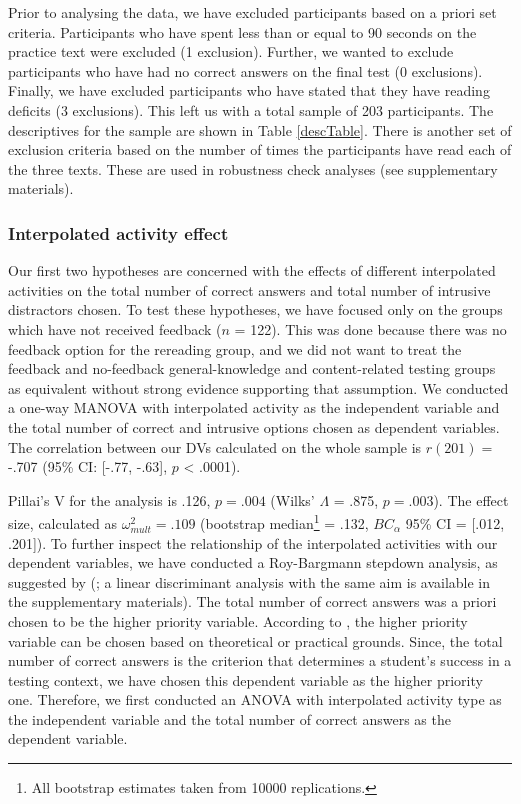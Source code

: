 \documentclass[../main.tex]{subfiles}
\begin{document}
Prior to analysing the data, we have excluded participants based on a
priori set criteria. Participants who have spent less than or equal to
90 seconds on the practice text were excluded (1 exclusion). Further, we
wanted to exclude participants who have had no correct answers on the
final test (0 exclusions). Finally, we have excluded participants who
have stated that they have reading deficits (3 exclusions). This left us
with a total sample of 203 participants. The descriptives for the sample
are shown in Table \ref{descTable}. There is another set of exclusion
criteria based on the number of times the participants have read each of
the three texts. These are used in robustness check analyses (see
supplementary materials).

\hypertarget{interpolated-activity-effect}{%
\subsubsection{Interpolated activity
effect}\label{interpolated-activity-effect}}

Our first two hypotheses are concerned with the effects of different
interpolated activities on the total number of correct answers and total
number of intrusive distractors chosen. To test these hypotheses, we
have focused only on the groups which have not received feedback (\(n\)
= 122). This was done because there was no feedback option for the
rereading group, and we did not want to treat the feedback and
no-feedback general-knowledge and content-related testing groups as
equivalent without strong evidence supporting that assumption. We
conducted a one-way MANOVA with interpolated activity as the independent
variable and the total number of correct and intrusive options chosen as
dependent variables. The correlation between our DVs calculated on the
whole sample is \(r(201) =\) -.707 (95\% CI: {[}-.77, -.63{]}, \(p\)
\textless{} .0001).

Pillai's V for the analysis is .126, \(p = .004\) (Wilks' \(\Lambda\) =
.875, \(p = .003\)). The effect size, calculated as
\(\omega^2_{mult} = .109\) (bootstrap
median\footnote{All bootstrap estimates taken from 10000 replications.}
= .132, \(BC_\alpha\) 95\% CI = {[}.012, .201{]}). To further inspect
the relationship of the interpolated activities with our dependent
variables, we have conducted a Roy-Bargmann stepdown analysis, as
suggested by \citeauthor{tabachnickUsingMultivariateStatistics2012}
(\citeyear{tabachnickUsingMultivariateStatistics2012}; a linear
discriminant analysis with the same aim is available in the
supplementary materials). The total number of correct answers was a
priori chosen to be the higher priority variable. According to
\citet{tabachnickUsingMultivariateStatistics2012}, the higher priority
variable can be chosen based on theoretical or practical grounds. Since,
the total number of correct answers is the criterion that determines a
student's success in a testing context, we have chosen this dependent
variable as the higher priority one. Therefore, we first conducted an
ANOVA with interpolated activity type as the independent variable and
the total number of correct answers as the dependent variable.
\end{document}
